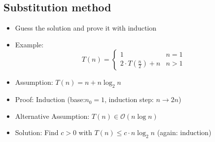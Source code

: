 \documentclass[12pt, a4paper]{scrartcl}
\newcommand{\bigO}{\mathcal{O}}
\begin{document}
\subsection{Substitution method}
\label{sec:substitution_method}
\begin{itemize}
\item Guess the solution and prove it with induction
\item Example:
  \begin{equation*}
    T(n)=
    \left\{
      \begin{array}{ll}
        1&n=1 \\
        2\cdot T
        \left(
        \frac{n}{2}
        \right) +n&n>1
      \end{array}
    \right.
  \end{equation*}
\item Assumption: $T(n)=n+n\log_2n$
\item Proof: Induction (base:$n_0=1$, induction step: $n\rightarrow 2n$)
\item Alternative Assumption: $T(n)\in\bigO(n\log n)$
\item Solution: Find $c>0$ with $T(n)\le c\cdot n\log_2n$ (again: induction)
\end{itemize}
\end{document}
